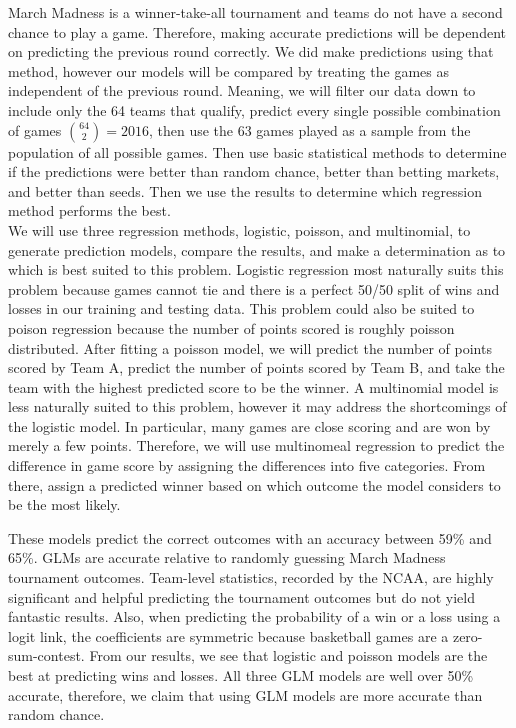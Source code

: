 \documentclass[
  man,floatsintext]{apa6}
\begin{document}
March Madness is a winner-take-all tournament and teams do not have a second chance to play a game. Therefore, making accurate predictions will be dependent on predicting the previous round correctly. We did make predictions using that method, however our models will be compared by treating the games as independent of the previous round. Meaning, we will filter our data down to include only the 64 teams that qualify, predict every single possible combination of games \({64\choose 2} = 2016\), then use the 63 games played as a sample from the population of all possible games. Then use basic statistical methods to determine if the predictions were better than random chance, better than betting markets, and better than seeds. Then we use the results to determine which regression method performs the best.\\
We will use three regression methods, logistic, poisson, and multinomial, to generate prediction models, compare the results, and make a determination as to which is best suited to this problem. Logistic regression most naturally suits this problem because games cannot tie and there is a perfect 50/50 split of wins and losses in our training and testing data. This problem could also be suited to poison regression because the number of points scored is roughly poisson distributed. After fitting a poisson model, we will predict the number of points scored by Team A, predict the number of points scored by Team B, and take the team with the highest predicted score to be the winner. A multinomial model is less naturally suited to this problem, however it may address the shortcomings of the logistic model. In particular, many games are close scoring and are won by merely a few points. Therefore, we will use multinomeal regression to predict the difference in game score by assigning the differences into five categories. From there, assign a predicted winner based on which outcome the model considers to be the most likely.

These models predict the correct outcomes with an accuracy between 59\% and 65\%. GLMs are accurate relative to randomly guessing March Madness tournament outcomes. Team-level statistics, recorded by the NCAA, are highly significant and helpful predicting the tournament outcomes but do not yield fantastic results. Also, when predicting the probability of a win or a loss using a logit link, the coefficients are symmetric because basketball games are a zero-sum-contest. From our results, we see that logistic and poisson models are the best at predicting wins and losses. All three GLM models are well over 50\% accurate, therefore, we claim that using GLM models are more accurate than random chance.
\end{document}
